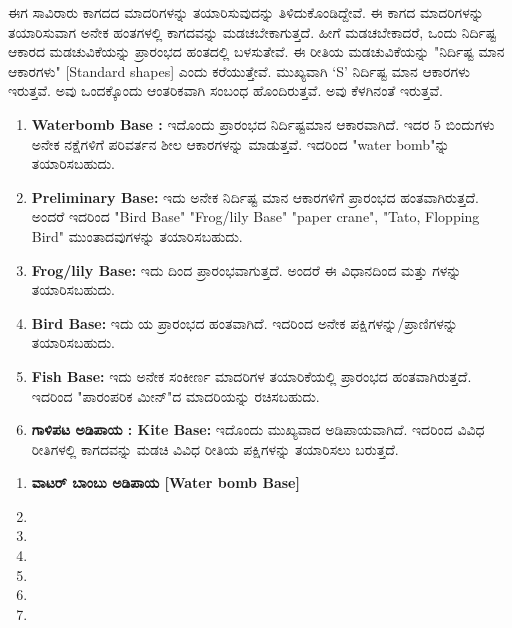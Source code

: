  ಈಗ ಸಾವಿರಾರು ಕಾಗದದ ಮಾದರಿಗಳನ್ನು ತಯಾರಿಸುವುದನ್ನು ತಿಳಿದುಕೊಂಡಿದ್ದೇವೆ. ಈ ಕಾಗದ ಮಾದರಿಗಳನ್ನು ತಯಾರಿಸುವಾಗ ಅನೇಕ ಹಂತಗಳಲ್ಲಿ ಕಾಗದವನ್ನು ಮಡಚಬೇಕಾಗುತ್ತದೆ. ಹೀಗೆ ಮಡಚಬೇಕಾದರೆ, ಒಂದು ನಿರ್ದಿಷ್ಟ ಆಕಾರದ ಮಡಚುವಿಕೆಯನ್ನು ಪ್ರಾರಂಭದ ಹಂತದಲ್ಲಿ ಬಳಸುತೇವೆ. ಈ ರೀತಿಯ ಮಡಚುವಿಕೆಯನ್ನು "ನಿರ್ದಿಷ್ಟ ಮಾನ ಆಕಾರಗಳು" [Standard shapes] ಎಂದು ಕರೆಯುತ್ತೇವೆ. ಮುಖ್ಯವಾಗಿ `S' ನಿರ್ದಿಷ್ಟ ಮಾನ ಆಕಾರಗಳು ಇರುತ್ತವೆ. ಅವು ಒಂದಕ್ಕೊಂದು ಆಂತರಿಕವಾಗಿ ಸಂಬಂಧ ಹೊಂದಿರುತ್ತವೆ. ಅವು ಕೆಳಗಿನಂತೆ ಇರುತ್ತವೆ. 
  \begin{enumerate}
  \item[{\bf [1]}] \textbf{Waterbomb Base :} ಇದೊಂದು ಪ್ರಾರಂಭದ ನಿರ್ದಿಷ್ಟಮಾನ ಆಕಾರವಾಗಿದೆ. ಇದರ 5 ಬಿಂದುಗಳು ಅನೇಕ ನಕ್ಷೆಗಳಿಗೆ ಪರಿವರ್ತನ ಶೀಲ ಆಕಾರಗಳನ್ನು ಮಾಡುತ್ತವೆ. ಇದರಿಂದ "water bomb"ನ್ನು ತಯಾರಿಸಬಹುದು.
  
  \item[{\bf [2]}] \textbf{Preliminary Base:} ಇದು ಅನೇಕ ನಿರ್ದಿಷ್ಟ ಮಾನ ಆಕಾರಗಳಿಗೆ ಪ್ರಾರಂಭದ ಹಂತವಾಗಿರುತ್ತದೆ. ಅಂದರೆ ಇದರಿಂದ "Bird Base" "Frog/lily Base" "paper crane", "Tato, Flopping Bird"  ಮುಂತಾದವುಗಳನ್ನು ತಯಾರಿಸಬಹುದು.  
  
  \item[{\bf [3]}] \textbf{Frog/lily Base:} ಇದು ದಿಂದ ಪ್ರಾರಂಭವಾಗುತ್ತದೆ. ಅಂದರೆ ಈ ವಿಧಾನದಿಂದ ಮತ್ತು ಗಳನ್ನು ತಯಾರಿಸಬಹುದು.
   
  \item[{\bf [4]}] \textbf{Bird  Base:} ಇದು ಯ ಪ್ರಾರಂಭದ ಹಂತವಾಗಿದೆ. ಇದರಿಂದ ಅನೇಕ ಪಕ್ಷಿಗಳನ್ನು/ಪ್ರಾಣಿಗಳನ್ನು ತಯಾರಿಸಬಹುದು. 
  
  \item[{\bf [5]}] \textbf{Fish Base:}  ಇದು ಅನೇಕ ಸಂಕೀರ್ಣ ಮಾದರಿಗಳ ತಯಾರಿಕೆಯಲ್ಲಿ ಪ್ರಾರಂಭದ ಹಂತವಾಗಿರುತ್ತದೆ. ಇದರಿಂದ "ಪಾರಂಪರಿಕ ಮೀನ್"ದ ಮಾದರಿಯನ್ನು ರಚಿಸಬಹುದು.
  
  \item[{\bf [6]}] \textbf{ಗಾಳಿಪಟ ಅಡಿಪಾಯ : Kite Base:} ಇದೊಂದು ಮುಖ್ಯವಾದ ಅಡಿಪಾಯವಾಗಿದೆ. ಇದರಿಂದ ವಿವಿಧ ರೀತಿಗಳಲ್ಲಿ ಕಾಗದವನ್ನು ಮಡಚಿ ವಿವಿಧ ರೀತಿಯ ಪಕ್ಷಿಗಳನ್ನು ತಯಾರಿಸಲು ಬರುತ್ತದೆ. 
     \end{enumerate}
\begin{enumerate}
\item[{\bf [1]}] \textbf{ವಾಟರ್ ಬಾಂಬು ಅಡಿಪಾಯ  [Water bomb Base]}

\item[{\bf [2]}]

\item[{\bf [3]}]

\item[{\bf [4]}]

\item[{\bf [5]}]

\item[{\bf [6]}]

\item[{\bf [7]}]

\end{enumerate}
     
 
 
    
